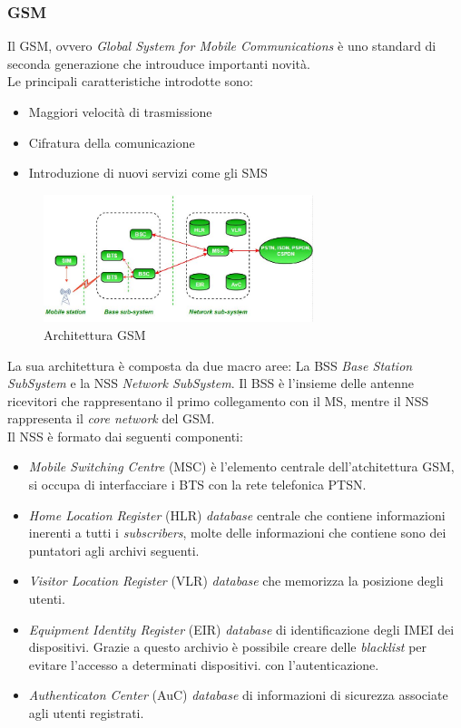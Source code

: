 \subsubsection{GSM}
Il GSM, ovvero \textit{Global System for Mobile Communications}\cite{gsm} è uno standard di seconda generazione che introuduce importanti novità.\\
Le principali caratteristiche introdotte sono:
\begin{itemize}
    \item Maggiori velocità di trasmissione
    \item Cifratura della comunicazione
    \item Introduzione di nuovi servizi come gli SMS
\end{itemize}
\begin{figure}[ht]
    \centering
    \includegraphics[width=0.7\textwidth]{images/2g-gsm.jpg}
    \caption{Architettura GSM}
\end{figure}
La sua architettura è composta da due macro aree: La BSS \textit{Base Station SubSystem} e la NSS \textit{Network SubSystem}.
Il BSS è l'insieme delle antenne ricevitori che rappresentano il primo collegamento con il MS, mentre il NSS rappresenta il \textit{core network} del GSM.\\
Il NSS è formato dai seguenti componenti:
\begin{itemize}
    \item \textit{Mobile Switching Centre} (MSC) è l'elemento centrale dell'atchitettura GSM, si occupa di interfacciare i BTS con la rete telefonica PTSN.
    \item \textit{Home Location Register} (HLR) \textit{database} centrale che contiene informazioni inerenti a tutti i \textit{subscribers}, molte delle informazioni
    che contiene sono dei puntatori agli archivi seguenti.
    \item \textit{Visitor Location Register} (VLR) \textit{database} che memorizza la posizione degli utenti.
    \item \textit{Equipment Identity Register} (EIR) \textit{database} di identificazione degli IMEI dei dispositivi. Grazie a questo archivio è possibile creare delle \textit{blacklist}
    per evitare l'accesso a determinati dispositivi.
    con l'autenticazione.
    \item \textit{Authenticaton Center} (AuC) \textit{database} di informazioni di sicurezza associate agli utenti registrati.
\end{itemize}

